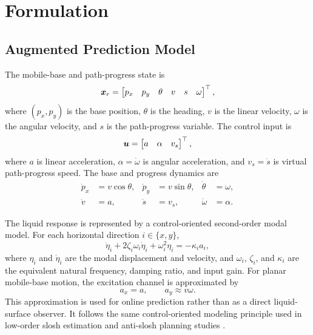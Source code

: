 \section{\SPMPC{} Formulation}

\subsection{Augmented Prediction Model}

The mobile-base and path-progress state is
\begin{equation}
  \bm{x}_{r} =
  \begin{bmatrix}
    p_x & p_y & \theta & v & s & \omega
  \end{bmatrix}^{\top},
\end{equation}
where $(p_x,p_y)$ is the base position, $\theta$ is the heading, $v$ is the linear velocity, $\omega$ is the angular velocity, and $s$ is the path-progress variable.
The control input is
\begin{equation}
  \bm{u} =
  \begin{bmatrix}
    a & \alpha & v_s
  \end{bmatrix}^{\top},
\end{equation}
where $a$ is linear acceleration, $\alpha=\dot{\omega}$ is angular acceleration, and $v_s=\dot{s}$ is virtual path-progress speed.
The base and progress dynamics are
\begin{equation}
\begin{aligned}
  \dot{p}_x &= v\cos\theta, &
  \dot{p}_y &= v\sin\theta, &
  \dot{\theta} &= \omega,\\
  \dot{v} &= a, &
  \dot{s} &= v_s, &
  \dot{\omega} &= \alpha .
\end{aligned}
\label{eq:method_base_progress}
\end{equation}

The liquid response is represented by a control-oriented second-order modal model.
For each horizontal direction $i\in\{x,y\}$,
\begin{equation}
  \ddot{\eta}_i
  +2\zeta_i\omega_i\dot{\eta}_i
  +\omega_i^2\eta_i
  =-\kappa_i a_i,
  \label{eq:method_slosh_dynamics}
\end{equation}
where $\eta_i$ and $\dot{\eta}_i$ are the modal displacement and velocity, and $\omega_i$, $\zeta_i$, and $\kappa_i$ are the equivalent natural frequency, damping ratio, and input gain.
For planar mobile-base motion, the excitation channel is approximated by
\begin{equation}
  a_x=a,\qquad a_y\approx v\omega .
  \label{eq:method_excitation}
\end{equation}
This approximation is used for online prediction rather than as a direct liquid-surface observer.
It follows the same control-oriented modeling principle used in low-order slosh estimation and anti-slosh planning studies \cite{A01_Leva2021,A02_Guagliumi2021}.

